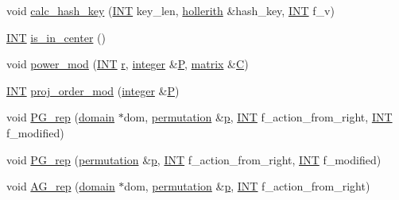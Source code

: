 \begin{DoxyCompactItemize}
\item 
void \mbox{\hyperlink{classmatrix_a61ce2d156303d0a83652cc86c2ad51b7}{calc\+\_\+hash\+\_\+key}} (\mbox{\hyperlink{galois_8h_a09fddde158a3a20bd2dcadb609de11dc}{I\+NT}} key\+\_\+len, \mbox{\hyperlink{classhollerith}{hollerith}} \&hash\+\_\+key, \mbox{\hyperlink{galois_8h_a09fddde158a3a20bd2dcadb609de11dc}{I\+NT}} f\+\_\+v)
\item 
\mbox{\hyperlink{galois_8h_a09fddde158a3a20bd2dcadb609de11dc}{I\+NT}} \mbox{\hyperlink{classmatrix_aecb27f51504ac8d90bb280b6a851942d}{is\+\_\+in\+\_\+center}} ()
\item 
void \mbox{\hyperlink{classmatrix_a7c9caac34a30994119cd7048df71df6e}{power\+\_\+mod}} (\mbox{\hyperlink{galois_8h_a09fddde158a3a20bd2dcadb609de11dc}{I\+NT}} \mbox{\hyperlink{alphabet2_8_c_acab531abaa74a7e664e3986f2522b33a}{r}}, \mbox{\hyperlink{classinteger}{integer}} \&\mbox{\hyperlink{simeon_8_c_a7fa15551e800919e93401fbbcd8e71e8}{P}}, \mbox{\hyperlink{classmatrix}{matrix}} \&\mbox{\hyperlink{costas_8_c_aacbbb35f36efadbb40803bfb5480b737}{C}})
\item 
\mbox{\hyperlink{galois_8h_a09fddde158a3a20bd2dcadb609de11dc}{I\+NT}} \mbox{\hyperlink{classmatrix_ab201caa82893894059d9e2432bd6b52a}{proj\+\_\+order\+\_\+mod}} (\mbox{\hyperlink{classinteger}{integer}} \&\mbox{\hyperlink{simeon_8_c_a7fa15551e800919e93401fbbcd8e71e8}{P}})
\item 
void \mbox{\hyperlink{classmatrix_a2b77483722eaba5108902dbbb96fc986}{P\+G\+\_\+rep}} (\mbox{\hyperlink{classdomain}{domain}} $\ast$dom, \mbox{\hyperlink{classpermutation}{permutation}} \&\mbox{\hyperlink{alphabet2_8_c_a533391314665d6bf1b5575e9a9cd8552}{p}}, \mbox{\hyperlink{galois_8h_a09fddde158a3a20bd2dcadb609de11dc}{I\+NT}} f\+\_\+action\+\_\+from\+\_\+right, \mbox{\hyperlink{galois_8h_a09fddde158a3a20bd2dcadb609de11dc}{I\+NT}} f\+\_\+modified)
\item 
void \mbox{\hyperlink{classmatrix_af084532cc1d1b518ac2a6e7de1da3fa5}{P\+G\+\_\+rep}} (\mbox{\hyperlink{classpermutation}{permutation}} \&\mbox{\hyperlink{alphabet2_8_c_a533391314665d6bf1b5575e9a9cd8552}{p}}, \mbox{\hyperlink{galois_8h_a09fddde158a3a20bd2dcadb609de11dc}{I\+NT}} f\+\_\+action\+\_\+from\+\_\+right, \mbox{\hyperlink{galois_8h_a09fddde158a3a20bd2dcadb609de11dc}{I\+NT}} f\+\_\+modified)
\item 
void \mbox{\hyperlink{classmatrix_a59a194ad8179725404d2b47a73070a88}{A\+G\+\_\+rep}} (\mbox{\hyperlink{classdomain}{domain}} $\ast$dom, \mbox{\hyperlink{classpermutation}{permutation}} \&\mbox{\hyperlink{alphabet2_8_c_a533391314665d6bf1b5575e9a9cd8552}{p}}, \mbox{\hyperlink{galois_8h_a09fddde158a3a20bd2dcadb609de11dc}{I\+NT}} f\+\_\+action\+\_\+from\+\_\+right)

\end{DoxyCompactItemize}
